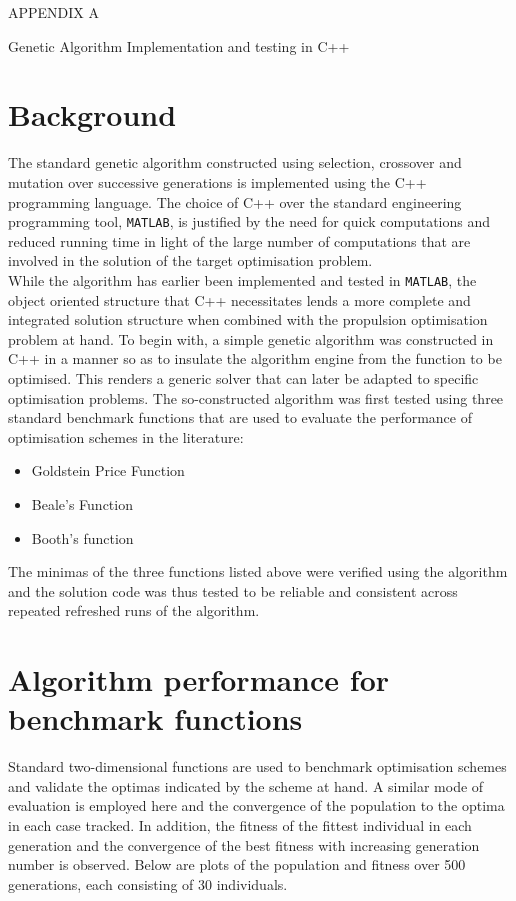 \documentclass[a4paper]{article}
\begin{document}
\centerline{\sc \large APPENDIX A}
\vspace{.5pc}
\centerline{\sc Genetic Algorithm Implementation and testing in C++}
\vspace{2pc}

\section{Background}
The standard genetic algorithm constructed using selection, crossover and mutation over successive generations is implemented using the C++ programming language. The choice of C++ over the standard engineering programming tool, \verb!MATLAB!, is justified by the need for quick computations and reduced running time in light of the large number of computations that are involved in the solution of the target optimisation problem. \\

While the algorithm has earlier been implemented and tested in \verb!MATLAB!, the object oriented structure that C++ necessitates lends a more complete and integrated solution structure when combined with the propulsion optimisation problem at hand. To begin with, a simple genetic algorithm was constructed in C++ in a manner so as to insulate the algorithm engine from the function to be optimised. This renders a generic solver that can later be adapted to specific optimisation problems. The so-constructed algorithm was first tested using three standard benchmark functions that are used to evaluate the performance of optimisation schemes in the literature:
\begin{itemize}
\item Goldstein Price Function
\item Beale's Function
\item Booth's function
\end{itemize}

The minimas of the three functions listed above were verified using the algorithm and the solution code was thus tested to be reliable and consistent across repeated refreshed runs of the algorithm.\\

\section{Algorithm performance for benchmark functions}

Standard two-dimensional functions are used to benchmark optimisation schemes and validate the optimas indicated by the scheme at hand. A similar mode of evaluation is employed here and the convergence of the population to the optima in each case tracked. In addition, the fitness of the fittest individual in each generation and the convergence of the best fitness with increasing generation number is observed. Below are plots of the population and fitness over 500 generations, each consisting of 30 individuals.\\ 
\end{document}
